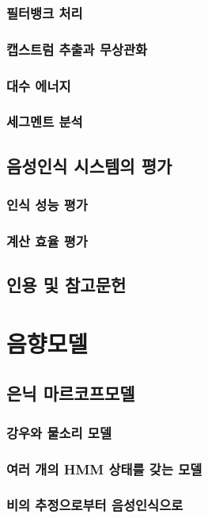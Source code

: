 \documentclass{book}
\begin{document}
\subsection{필터뱅크 처리}
\subsection{캡스트럼 추출과 무상관화}
\subsection{대수 에너지}
\subsection{세그멘트 분석}

\section{음성인식 시스템의 평가}
\subsection{인식 성능 평가}
\subsection{계산 효율 평가}

\section*{인용 및 참고문헌}

\chapter{음향모델}
\section{은닉 마르코프모델}
\subsection{강우와 물소리 모델}
\subsection{여러 개의 HMM 상태를 갖는 모델}
\subsection{비의 추정으로부터 음성인식으로}
\end{document}
